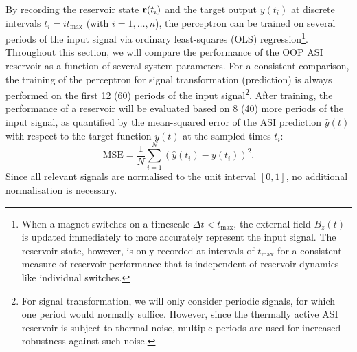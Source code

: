 By recording the reservoir state $\boldsymbol{\mathbf{r}}(t_i)$ and the target output $y(t_i)$ at discrete intervals $t_i = i t_\mathrm{max}$ (with $i = 1,\dots,n$), the perceptron can be trained on several periods of the input signal via ordinary least-squares (OLS) regression\footnote{
	When a magnet switches on a timescale $\Delta t < t_\mathrm{max}$, the external field $B_z(t)$ is updated immediately to more accurately represent the input signal.
	The reservoir state, however, is only recorded at intervals of $t_\mathrm{max}$ for a consistent measure of reservoir performance that is independent of reservoir dynamics like individual switches.
}.
Throughout this section, we will compare the performance of the OOP ASI reservoir as a function of several system parameters.
For a consistent comparison, the training of the perceptron for signal transformation (prediction) is always performed on the first 12 (60) periods of the input signal\footnote{
	For signal transformation, we will only consider periodic signals, for which one period would normally suffice.
	However, since the thermally active ASI reservoir is subject to thermal noise, multiple periods are used for increased robustness against such noise.
}.
After training, the performance of a reservoir will be evaluated based on 8 (40) more periods of the input signal, as quantified by the mean-squared error of the ASI prediction $\hat{y}(t)$ with respect to the target function $y(t)$ at the sampled times $t_i$:
\begin{equation}
	\mathrm{MSE} = \frac{1}{N} \sum_{i=1}^N (\hat{y}(t_i) - y(t_i))^2 \mathrm{.}
\end{equation}
Since all relevant signals are normalised to the unit interval $[0,1]$, no additional normalisation is necessary. \par
